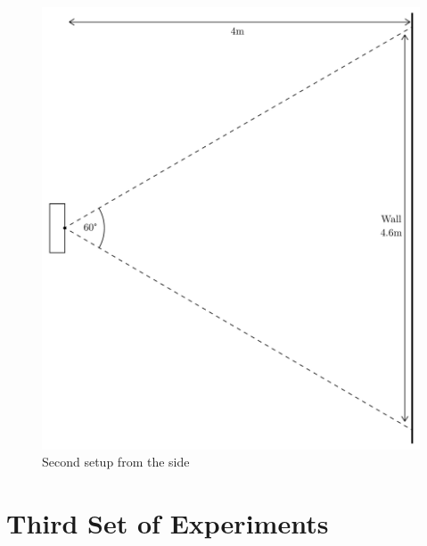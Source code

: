 \documentclass[../thesis/thesis.tex]{subfiles}
\begin{document}
 \begin{figure}
 \centering
 \includegraphics[width=\textwidth,page=2]{../diagrams/second-exp-setup.pdf}
 \caption{Second setup from the side}
 \label{fig:exps:2setupside}
 \end{figure}
 
 \section{Third Set of Experiments}
\end{document}
